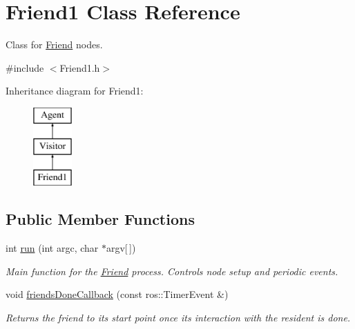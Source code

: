 \hypertarget{classFriend1}{\section{Friend1 Class Reference}
\label{classFriend1}
}


Class for \hyperlink{classFriend}{Friend} nodes.  




{\ttfamily \#include $<$Friend1.\-h$>$}

Inheritance diagram for Friend1\-:\begin{figure}[H]
\begin{center}
\leavevmode
\includegraphics[height=3.000000cm]{classFriend1}
\end{center}
\end{figure}
\subsection*{Public Member Functions}
\begin{DoxyCompactItemize}
\item 
\hypertarget{classFriend1_af76fdf88c44de0410ad51c9290e88a4e}{int \hyperlink{classFriend1_af76fdf88c44de0410ad51c9290e88a4e}{run} (int argc, char $\ast$argv\mbox{[}$\,$\mbox{]})}\label{classFriend1_af76fdf88c44de0410ad51c9290e88a4e}

\begin{DoxyCompactList}\small\item\em Main function for the \hyperlink{classFriend}{Friend} process. Controls node setup and periodic events. \end{DoxyCompactList}\item 
\hypertarget{classFriend1_a18a2d1c5a80fd0b2c13bc4001fae540b}{void \hyperlink{classFriend1_a18a2d1c5a80fd0b2c13bc4001fae540b}{friends\-Done\-Callback} (const ros\-::\-Timer\-Event \&)}\label{classFriend1_a18a2d1c5a80fd0b2c13bc4001fae540b}

\begin{DoxyCompactList}\small\item\em Returns the friend to its start point once its interaction with the resident is done. \end{DoxyCompactList}\end{DoxyCompactItemize}
